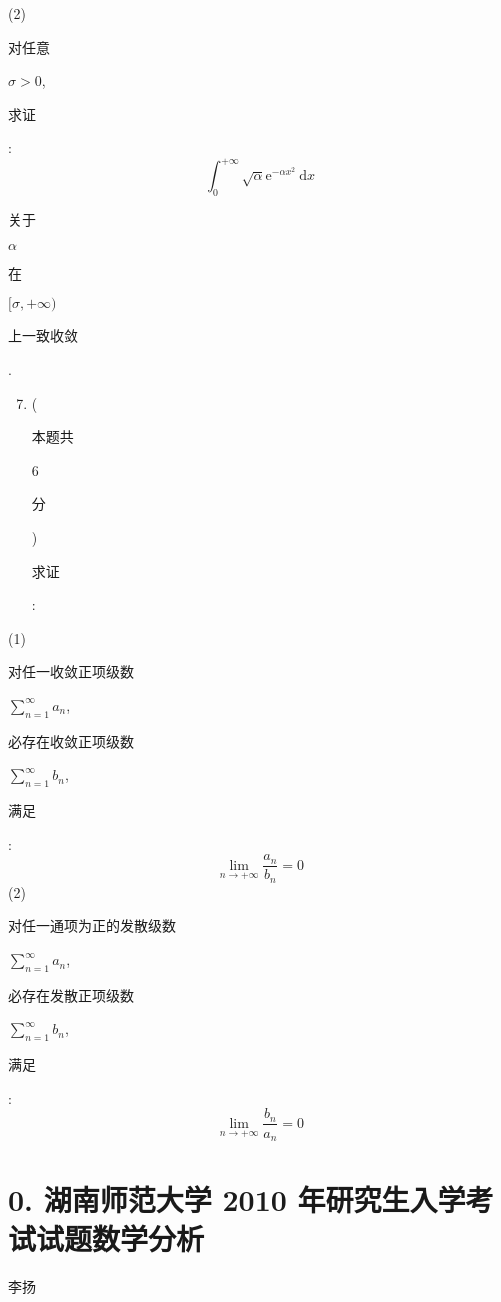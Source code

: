 \documentclass[10pt]{article}
\begin{document}
(2) \begin{CJK}{UTF8}{mj}对任意\end{CJK} $\sigma>0$, \begin{CJK}{UTF8}{mj}求证\end{CJK}:
$$
\int_{0}^{+\infty} \sqrt{\alpha} \mathrm{e}^{-\alpha x^{2}} \mathrm{~d} x
$$
\begin{CJK}{UTF8}{mj}关于\end{CJK} $\alpha$ \begin{CJK}{UTF8}{mj}在\end{CJK} $[\sigma,+\infty)$ \begin{CJK}{UTF8}{mj}上一致收敛\end{CJK}.

\begin{enumerate}
  \setcounter{enumi}{6}
  \item (\begin{CJK}{UTF8}{mj}本题共\end{CJK} 6 \begin{CJK}{UTF8}{mj}分\end{CJK}) \begin{CJK}{UTF8}{mj}求证\end{CJK}:
\end{enumerate}
(1) \begin{CJK}{UTF8}{mj}对任一收敛正项级数\end{CJK} $\sum_{n=1}^{\infty} a_{n}$, \begin{CJK}{UTF8}{mj}必存在收敛正项级数\end{CJK} $\sum_{n=1}^{\infty} b_{n}$, \begin{CJK}{UTF8}{mj}满足\end{CJK}:
$$
\lim _{n \rightarrow+\infty} \frac{a_{n}}{b_{n}}=0
$$
(2) \begin{CJK}{UTF8}{mj}对任一通项为正的发散级数\end{CJK} $\sum_{n=1}^{\infty} a_{n}$, \begin{CJK}{UTF8}{mj}必存在发散正项级数\end{CJK} $\sum_{n=1}^{\infty} b_{n}$, \begin{CJK}{UTF8}{mj}满足\end{CJK}:
$$
\lim _{n \rightarrow+\infty} \frac{b_{n}}{a_{n}}=0
$$

\section{0. 湖南师范大学 2010 年研究生入学考试试题数学分析}
\begin{CJK}{UTF8}{mj}李扬\end{CJK}
\end{document}
